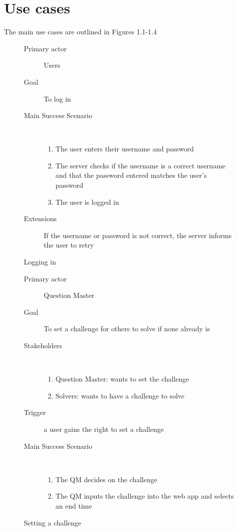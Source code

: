 \documentclass{report}
\begin{document}
\section{Use cases}
The main use cases are outlined in Figures 1.1-1.4
{

\begin{figure}[H]
\caption{Logging in}
\begin{description}
\item[Primary actor] Users
\item[Goal] To log in
\item[Main Success Scenario]~
\begin{enumerate}
\item The user enters their username and password
\item The server checks if the username is a correct username and that the password entered matches the user’s password
\item The user is logged in
\end{enumerate}
\item[Extensions] If the username or password is not correct, the server informs the user to retry
\end{description}
\end{figure}

\begin{figure}[H]
\caption{Setting a challenge}
\begin{description}
\item[Primary actor] Question Master
\item[Goal] To set a challenge for others to solve if none already is
\item[Stakeholders]~
\begin{enumerate}
\item Question Master: wants to set the challenge
\item Solvers: wants to have a challenge to solve
\end{enumerate}
\item[Trigger] a user gains the right to set a challenge
\item[Main Success Scenario]~
\begin{enumerate}
\item The QM decides on the challenge
\item The QM inputs the challenge into the web app and selects an end time
\end{enumerate}
\end{description}
\end{figure}

}
\end{document}
